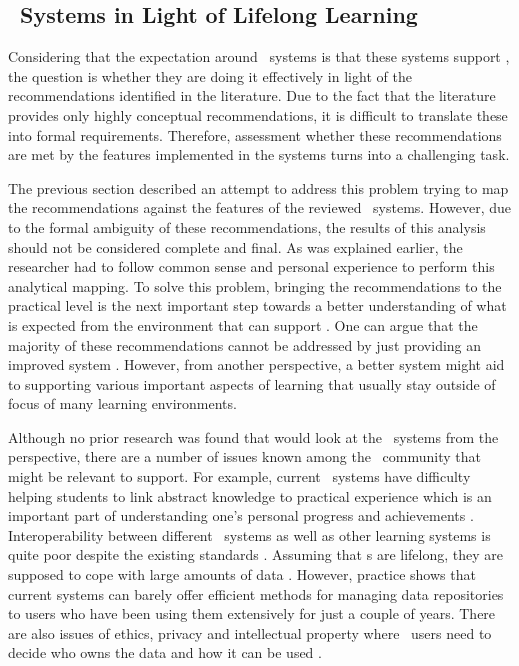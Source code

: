 \subsection{\ep~Systems in Light of Lifelong Learning}

Considering that the expectation around \ep~systems is that these systems
support \LLLsn, the question is whether they are doing it effectively in light
of the recommendations identified in the literature. Due to the fact that the
literature provides only highly conceptual recommendations, it is difficult to
translate these into formal requirements. Therefore, assessment whether these
recommendations are met by the features implemented in the systems turns into a
challenging task. 

The previous section described an attempt to address this problem trying to map
the recommendations against the features of the reviewed \ep~systems. However,
due to the formal ambiguity of these recommendations, the results of this
analysis should not be considered complete and final. As was explained earlier,
the researcher had to follow common sense and personal experience to perform this
analytical mapping. To solve this problem, bringing the recommendations to the
practical level is the next important step towards a better understanding of
what is expected from the environment that can support \LLLsn. One can argue
that the majority of these recommendations cannot be addressed by just providing
an improved system \citep{Schaffert2008}. However, from another perspective, a
better system might aid to supporting various important aspects of learning that
usually stay outside of focus of many learning environments.

Although no prior research was found that would look at the \ep~systems from the
\LLLs perspective, there are a number of issues known among the \ep~community
that might be relevant to \LLLs support. For example, current \ep~systems have
difficulty helping students to link abstract knowledge to practical experience
which is an important part of understanding one's personal progress and
achievements \citep{Chou2009}. Interoperability between different \ep~systems as
well as other learning systems is quite poor despite the existing standards
\citep{Clark2011}. Assuming that \ep s are lifelong, they are supposed to cope
with large amounts of data \citep{Butler2010}. However, practice shows that
current systems can barely offer efficient methods for managing data
repositories to users who have been using them extensively for just a couple of
years. There are also issues of ethics, privacy and intellectual property where
\ep~users need to decide who owns the data and how it can be used
\citep{Challis2005}.

